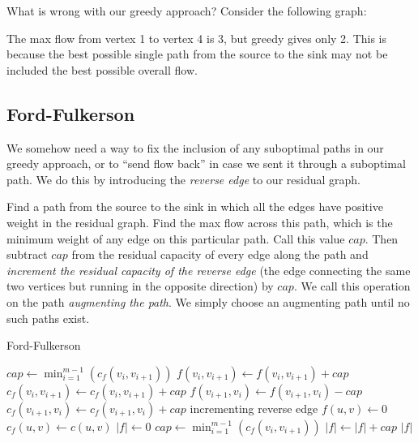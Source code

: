 What is wrong with our greedy approach? Consider the following graph:

\begin{center}
\end{center}

The max flow from vertex 1 to vertex 4 is 3, but greedy gives only 2. This is because the best possible single path from the source to the sink may not be included the best possible overall flow.

\subsection{Ford-Fulkerson}

We somehow need a way to fix the inclusion of any suboptimal paths in our greedy approach, or to ``send flow back'' in case we sent it through a suboptimal path. We do this by introducing the \textit{reverse edge} to our residual graph.

Find a path from the source to the sink in which all the edges have positive weight in the residual graph. Find the max flow across this path, which is the minimum weight of any edge on this particular path. Call this value $cap$. Then subtract $cap$ from the residual capacity of every edge along the path and \textit{increment the residual capacity of the reverse edge} (the edge connecting the same two vertices but running in the opposite direction) by $cap$. We call this operation on the path \textit{augmenting the path}. We simply choose an augmenting path until no such paths exist.

\begin{algorithm}[H]
\caption{Ford-Fulkerson}
\begin{algorithmic}
\State $cap \gets \min_{i=1}^{m-1}(c_f(v_i,v_{i+1}))$
	\State $f(v_i,v_{i+1}) \gets f(v_i,v_{i+1}) + cap$
	\State $c_f(v_i,v_{i+1}) \gets c_f(v_i,v_{i+1}) + cap$
	\State $f(v_{i+1},v_i) \gets f(v_{i+1},v_i) - cap$
	\State $c_f(v_{i+1},v_i) \gets c_f(v_{i+1},v_i) + cap$
	\Comment incrementing reverse edge
\EndFor
\EndFunction
{}
		\State $f(u,v) \gets 0$
		\State $c_f(u,v) \gets c(u,v)$
	\EndFor
	\State $|f| \gets 0$
		\State $cap \gets \min_{i=1}^{m-1}(c_f(v_i,v_{i+1}))$
		\State $|f| \gets |f| + cap$
		\State {}
	\EndWhile
	\Return $|f|$
\EndFunction
\end{algorithmic}
\end{algorithm}

